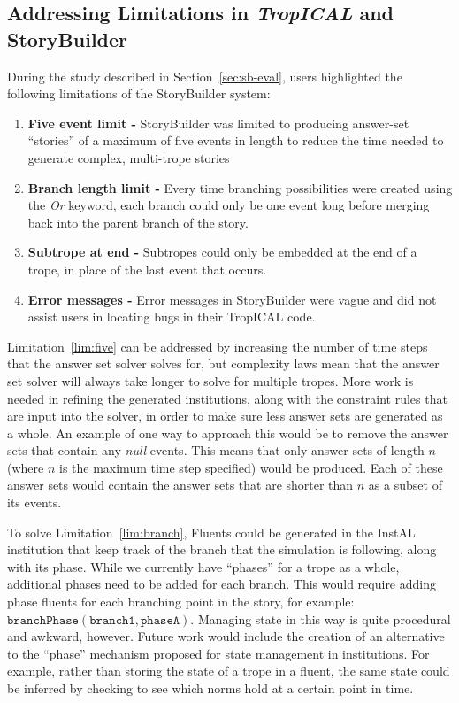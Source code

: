 \documentclass[11pt]{report}
\begin{document}
\subsection{Addressing Limitations in \emph{TropICAL} and StoryBuilder}
\label{sec:future-address}

During the study described in Section~\ref{sec:sb-eval}, users highlighted the
following limitations of the StoryBuilder system:

\begin{enumerate}[{Limitation} 1:]
\item\label{lim:five} \textbf{Five event limit -} StoryBuilder was limited to producing
  answer-set ``stories'' of a maximum of five events in length to reduce the
  time needed to generate complex, multi-trope stories
\item\label{lim:branch} \textbf{Branch length limit -} Every time branching
  possibilities were created using the \emph{Or} keyword, each branch could only
  be one event long before merging back into the parent branch of the story.
\item\label{lim:sub} \textbf{Subtrope at end -} Subtropes could only be embedded
  at the end of a trope, in place of the last event that occurs.
\item\label{lim:error} \textbf{Error messages -} Error messages in StoryBuilder
  were vague and did not assist users in locating bugs in their TropICAL code.
\end{enumerate}

Limitation~\ref{lim:five} can be addressed by increasing the number of time steps
that the answer set solver solves for, but complexity laws mean that the answer
set solver will always take longer to solve for multiple tropes.
More work is needed in refining the generated
institutions, along with the constraint rules that are input into the solver, in
order to make sure less answer sets are generated as a whole. An example of one
way to approach this would be to remove the answer sets that contain any
\emph{null} events. This means that only answer sets of length $n$ (where $n$ is
the maximum time step specified) would be produced. Each of these answer sets
would contain the answer sets that are shorter than $n$ as a subset of its events.

To solve Limitation~\ref{lim:branch}, Fluents could be
generated in the InstAL institution that keep track of the branch that the
simulation is following, along with its phase. While we currently have
``phases'' for a trope as a whole, additional phases need to be added for each
branch. This would require adding phase fluents for each branching point in the
story, for example: $\mathtt{branchPhase(branch1, phaseA)}$. Managing state
in this way is quite procedural and awkward, however. Future work would include
the creation of an alternative to
the ``phase'' mechanism proposed for state management in institutions. For
example, rather
than storing the state of a trope in a fluent, the same state could be inferred
by checking to see which norms hold at a certain point in time.
\end{document}
